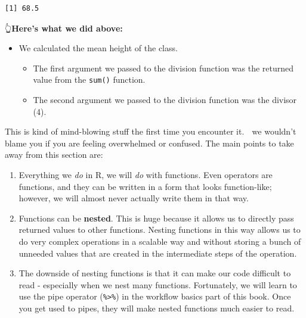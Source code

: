 \documentclass[
  letterpaper,
  DIV=11,
  numbers=noendperiod]{scrreprt}
\newenvironment{Shaded}{\begin{snugshade}}{\end{snugshade}}
\newcommand{\AttributeTok}[1]{\textcolor[rgb]{0.40,0.45,0.13}{#1}}
\newcommand{\DecValTok}[1]{\textcolor[rgb]{0.68,0.00,0.00}{#1}}
\newcommand{\FunctionTok}[1]{\textcolor[rgb]{0.28,0.35,0.67}{#1}}
\newcommand{\NormalTok}[1]{\textcolor[rgb]{0.00,0.23,0.31}{#1}}
\newcommand{\SpecialCharTok}[1]{\textcolor[rgb]{0.37,0.37,0.37}{#1}}
\newcommand{\StringTok}[1]{\textcolor[rgb]{0.13,0.47,0.30}{#1}}
\begin{document}
\begin{Shaded}
\end{Shaded}

\begin{verbatim}
[1] 68.5
\end{verbatim}

👆\textbf{Here's what we did above:}

\begin{itemize}
\item
  We calculated the mean height of the class.

  \begin{itemize}
  \item
    The first argument we passed to the division function was the
    returned value from the \texttt{sum()} function.
  \item
    The second argument we passed to the division function was the
    divisor (4).
  \end{itemize}
\end{itemize}

This is kind of mind-blowing stuff the first time you encounter it. 🤯
we wouldn't blame you if you are feeling overwhelmed or confused. The
main points to take away from this section are:

\begin{enumerate}
\def\labelenumi{\arabic{enumi}.}
\item
  Everything we \emph{do} in R, we will \emph{do} with functions. Even
  operators are functions, and they can be written in a form that looks
  function-like; however, we will almost never actually write them in
  that way.
\item
  Functions can be \textbf{nested}. This is huge because it allows us to
  directly pass returned values to other functions. Nesting functions in
  this way allows us to do very complex operations in a scalable way and
  without storing a bunch of unneeded values that are created in the
  intermediate steps of the operation.
\item
  The downside of nesting functions is that it can make our code
  difficult to read - especially when we nest many functions.
  Fortunately, we will learn to use the pipe operator
  (\texttt{\%\textgreater{}\%}) in the workflow basics part of this
  book. Once you get used to pipes, they will make nested functions much
  easier to read.
\end{enumerate}
\end{document}
